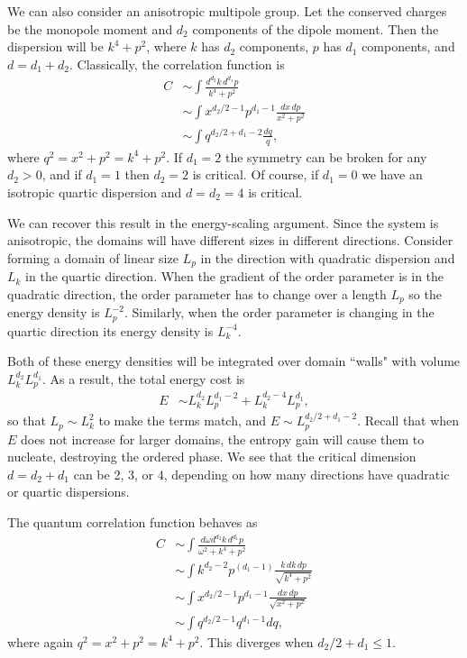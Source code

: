 \documentclass[pra,aps,twocolumn, amsfonts,amsmath,amssymb,nofootinbib,superscriptaddress]{revtex4-2}
\newcommand{\nn}{\nonumber\\}
\begin{document}
We can also consider an anisotropic multipole group. 
Let the conserved charges be the monopole moment and $d_2$ components of the dipole moment. Then the dispersion will be $k^4 + p^2$, where $k$ has $d_2$ components, $p$ has $d_1$ components, and $d = d_1+d_2$. Classically, the correlation function is
\begin{align}
C &\sim \int \frac{d^{d_2} k \, d^{d_1} p}{k^4 + p^2}\nn
&\sim \int x^{d_2/2 -1} p^{d_1-1} \frac{dx\, dp}{x^2 +p^2} \nn
&\sim \int q^{d_2/2 + d_1 - 2}\frac{dq}{q},
\end{align}
where $q^2 = x^2 + p^2 = k^4 + p^2$. 
If $d_1=2$ the symmetry can be broken for any $d_2>0$, and if $d_1=1$ then $d_2=2$  is critical. Of course, if $d_1=0$ we have an isotropic quartic dispersion and $d=d_2=4$ is critical. 

We can recover this result in  the energy-scaling argument. Since the system is anisotropic, the domains will have different sizes in different directions. Consider forming a domain of linear size $L_p$ in the  direction with quadratic dispersion and $L_k$ in the quartic direction. When the gradient of the order parameter is in the quadratic direction, the order parameter has to change over a length $L_p$ so the energy density is $L_p^{-2}$. Similarly, when the order parameter is changing in the quartic direction its energy density is $L_k^{-4}$. 

Both of these energy densities will be integrated over domain ``walls" with volume $L_k^{d_2} L_p^{d_1}$.
As a result, the total energy cost is
\begin{align}
E &\sim L_k^{d_2} L_p^{d_1-2} + L_k^{d_2-4} L_p^{d_1},
\end{align}
so that $L_p \sim L_k^2$ to make the terms match, and $E\sim L_p^{d_2/2+d_1-2}$. Recall that when $E$ does not increase for larger domains, the entropy gain will cause them to nucleate, destroying the ordered phase.
We see that the critical dimension $d= d_2 + d_1$ can be 2, 3, or 4, depending on how many directions have quadratic or quartic dispersions.

The quantum correlation function behaves as
\begin{align}
C &\sim \int \frac{d\omega d^{d_2} k \, d^{d_1} p}{\omega^2 + k^4 + p^2}\nn
&\sim \int k^{d_2 - 2} p^{ (d_1-1)} \frac{k\,dk\, dp}{\sqrt{k^4 + p^2}} \nn
&\sim \int x^{d_2/2-1} p^{d_1-1} \frac{dx\, dp}{\sqrt{x^2 + p^2}} \nn
&\sim \int q^{d_2/2 -1} q^{d_1 -1} dq,
\end{align}
where again $q^2 = x^2 + p^2 = k^4 + p^2$. This diverges when $d_2/2 + d_1 \le 1$. 
\end{document}
